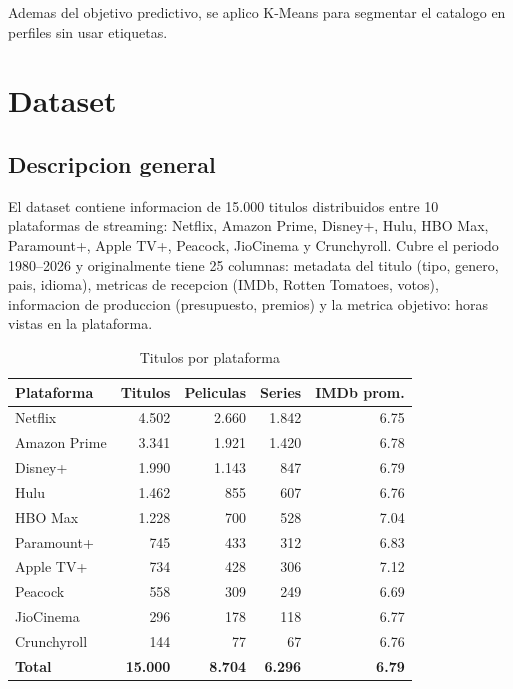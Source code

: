 \documentclass[12pt, a4paper]{article}
\begin{document}
Ademas del objetivo predictivo, se aplico K-Means para segmentar el catalogo en perfiles sin usar etiquetas.

\section{Dataset}

\subsection{Descripcion general}

El dataset contiene informacion de 15.000 titulos distribuidos entre 10 plataformas de streaming: Netflix, Amazon Prime, Disney+, Hulu, HBO Max, Paramount+, Apple TV+, Peacock, JioCinema y Crunchyroll. Cubre el periodo 1980--2026 y originalmente tiene 25 columnas: metadata del titulo (tipo, genero, pais, idioma), metricas de recepcion (IMDb, Rotten Tomatoes, votos), informacion de produccion (presupuesto, premios) y la metrica objetivo: horas vistas en la plataforma.

\begin{table}[H]
\centering
\caption{Titulos por plataforma}
\begin{tabular}{lrrrr}
\toprule
\textbf{Plataforma} & \textbf{Titulos} & \textbf{Peliculas} & \textbf{Series} & \textbf{IMDb prom.} \\
\midrule
Netflix        & 4.502 & 2.660 & 1.842 & 6.75 \\
Amazon Prime   & 3.341 & 1.921 & 1.420 & 6.78 \\
Disney+        & 1.990 & 1.143 &   847 & 6.79 \\
Hulu           & 1.462 &   855 &   607 & 6.76 \\
HBO Max        & 1.228 &   700 &   528 & 7.04 \\
Paramount+     &   745 &   433 &   312 & 6.83 \\
Apple TV+      &   734 &   428 &   306 & 7.12 \\
Peacock        &   558 &   309 &   249 & 6.69 \\
JioCinema      &   296 &   178 &   118 & 6.77 \\
Crunchyroll    &   144 &    77 &    67 & 6.76 \\
\midrule
\textbf{Total} & \textbf{15.000} & \textbf{8.704} & \textbf{6.296} & \textbf{6.79} \\
\bottomrule
\end{tabular}
\end{table}
\end{document}
